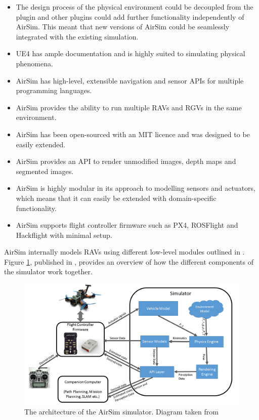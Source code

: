 \begin{itemize}
\item The design process of the physical environment could be decoupled from the plugin and other plugins could add further functionality independently of AirSim. This meant that new versions of AirSim could be seamlessly integrated with the existing simulation.

\item UE4 has ample documentation and is highly suited to simulating physical phenomena.

\item AirSim has high-level, extensible navigation and sensor APIs for multiple programming languages.

\item AirSim provides the ability to run multiple RAVs and RGVs in the same environment.

\item AirSim has been open-sourced with an MIT licence and was designed to be easily extended.

\item AirSim  provides an API to render unmodified images, depth maps and segmented images.

\item AirSim is highly modular in its approach to modelling sensors and actuators, which means that it can easily be extended with domain-specific functionality.

\item AirSim supports flight controller firmware such as PX4, ROSFlight and Hackflight with minimal setup.

\end{itemize}
AirSim internally models RAVs using different low-level modules outlined in \cite{Shah2017AirSim:Vehicles}. Figure  \ref{fig:AirSimArchitecture}, published in \cite{Shah2017AirSim:Vehicles}, provides an overview of how the different components of the simulator work together.

\begin{figure}[H]
    \centering
    \includegraphics[width=0.75\linewidth]{Chapters/SimulationEnv/Figs/AirSimArchitecture/AirSimArchitecture.png}
    \caption{The architecture of the AirSim simulator. Diagram taken from \cite{Shah2017AirSim:Vehicles}}
    \label{fig:AirSimArchitecture}
\end{figure}



